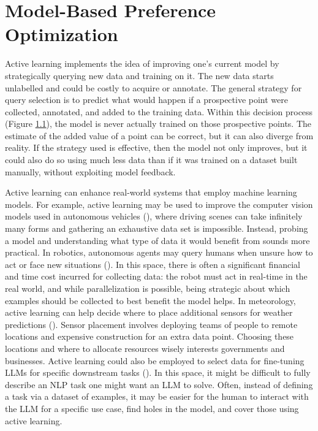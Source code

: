 \documentclass[
  letterpaper,
  DIV=11,
  numbers=noendperiod,
  oneside]{scrreprt}
\let\oldchapter\chapter
\def\chapter{%
  \setcounter{sidenote}{1}%
  \oldchapter
}
\theoremstyle{remark}
\begin{document}
\chapter{Model-Based Preference
Optimization}\label{model-based-preference-optimization}

Active learning implements the idea of improving one's current model by
strategically querying new data and training on it. The new data starts
unlabelled and could be costly to acquire or annotate. The general
strategy for query selection is to predict what would happen if a
prospective point were collected, annotated, and added to the training
data. Within this decision process (Figure \hyperref[fig:schema]{1.1}),
the model is never actually trained on those prospective points. The
estimate of the added value of a point can be correct, but it can also
diverge from reality. If the strategy used is effective, then the model
not only improves, but it could also do so using much less data than if
it was trained on a dataset built manually, without exploiting model
feedback.

Active learning can enhance real-world systems that employ machine
learning models. For example, active learning may be used to improve the
computer vision models used in autonomous vehicles
(), where driving
scenes can take infinitely many forms and gathering an exhaustive data
set is impossible. Instead, probing a model and understanding what type
of data it would benefit from sounds more practical. In robotics,
autonomous agents may query humans when unsure how to act or face new
situations (). In this space, there is often a significant financial and time
cost incurred for collecting data: the robot must act in real-time in
the real world, and while parallelization is possible, being strategic
about which examples should be collected to best benefit the model
helps. In meteorology, active learning can help decide where to place
additional sensors for weather predictions
().
Sensor placement involves deploying teams of people to remote locations
and expensive construction for an extra data point. Choosing these
locations and where to allocate resources wisely interests governments
and businesses. Active learning could also be employed to select data
for fine-tuning LLMs for specific downstream tasks
(). In this space, it
might be difficult to fully describe an NLP task one might want an LLM
to solve. Often, instead of defining a task via a dataset of examples,
it may be easier for the human to interact with the LLM for a specific
use case, find holes in the model, and cover those using active
learning.
\end{document}
